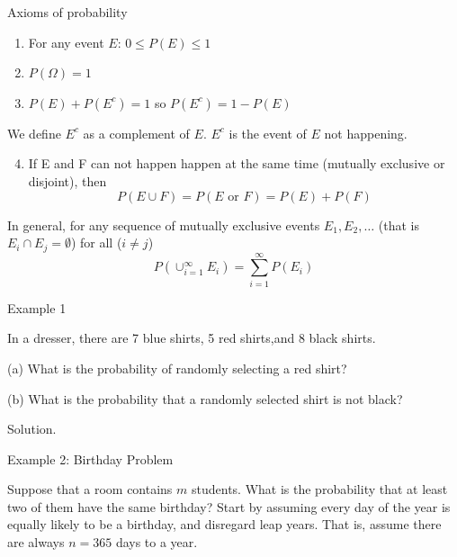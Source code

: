 \documentclass[
  ignorenonframetext,
]{beamer}
\providecommand{\tightlist}{%
  \setlength{\itemsep}{0pt}\setlength{\parskip}{0pt}}
\begin{document}
\begin{frame}{Axioms of probability}
\protect\hypertarget{axioms-of-probability}{}
\begin{enumerate}
\item
  For any event \(E\): \(0\leq P(E) \leq 1\)
\item
  \(P(\Omega)=1\)
\item
  \(P(E) + P(E^{c})=1\) so \(P(E^c)=1-P(E)\)
\end{enumerate}

We define \(E^{c}\) as a complement of \(E\). \(E^{c}\) is the event of
\(E\) not happening.

\begin{enumerate}
\setcounter{enumi}{3}
\tightlist
\item
  If E and F can not happen happen at the same time (mutually exclusive
  or disjoint), then \[P(E \cup F)=P(E \text{ or } F)=P(E) + P(F)\]
\end{enumerate}

In general, for any sequence of mutually exclusive events
\(E_1, E_2, \ldots\) (that is \(E_i \cap E_j = \emptyset\)) for all
(\(i\neq j\))
\[P\left(\cup_{i=1}^{\infty} E_i\right)=\sum_{i=1}^{\infty} P(E_i)\]
\end{frame}

\begin{frame}{Example 1}
\protect\hypertarget{example-1}{}
\begin{tcolorbox}

In a dresser, there are 7 blue shirts, 5 red shirts,and 8 black shirts.

(a) What is the probability of randomly selecting a red shirt?

(b) What is the probability that a randomly selected shirt is not black?

\end{tcolorbox}

\pause

\begin{tcolorbox}
Solution.

\vspace{30mm}

\end{tcolorbox}
\end{frame}

\begin{frame}{Example 2: Birthday Problem}
\protect\hypertarget{example-2-birthday-problem}{}
\begin{tcolorbox}

Suppose that a room contains $m$ students. What is the probability that at least two of them have the same birthday? Start by assuming every day of the year is equally likely to be a birthday, and disregard leap years. That is, assume there are always $n=365$ days to a year.

\end{tcolorbox}
\end{frame}
\end{document}
